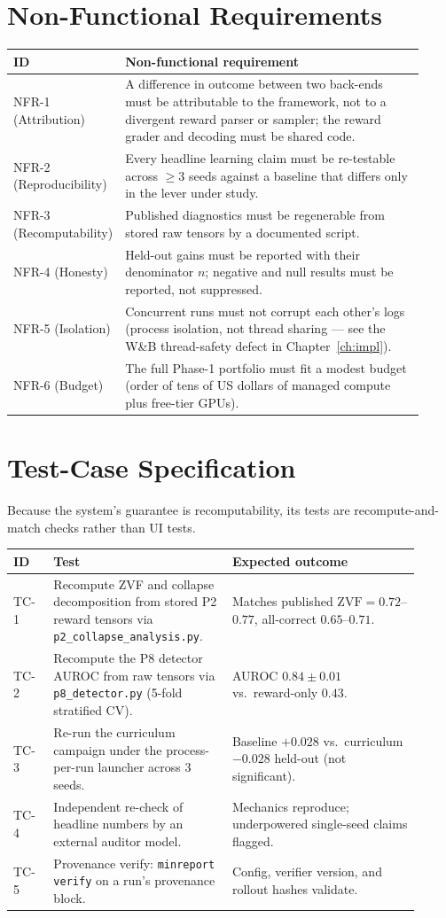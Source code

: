 \documentclass[12pt,a4paper]{report}
\newcommand{\zvf}{\mathrm{ZVF}}
\begin{document}
\section{Non-Functional Requirements}
\begin{longtable}{@{}L{0.10\linewidth}L{0.82\linewidth}@{}}
\toprule
\textbf{ID} & \textbf{Non-functional requirement} \\
\midrule
\endhead
NFR-1 (Attribution) & A difference in outcome between two back-ends must be
attributable to the framework, not to a divergent reward parser or sampler; the
reward grader and decoding must be shared code. \\
NFR-2 (Reproducibility) & Every headline learning claim must be re-testable across
$\ge 3$ seeds against a baseline that differs only in the lever under study. \\
NFR-3 (Recomputability) & Published diagnostics must be regenerable from stored raw
tensors by a documented script. \\
NFR-4 (Honesty) & Held-out gains must be reported with their denominator $n$;
negative and null results must be reported, not suppressed. \\
NFR-5 (Isolation) & Concurrent runs must not corrupt each other's logs (process
isolation, not thread sharing --- see the W\&B thread-safety defect in
Chapter~\ref{ch:impl}). \\
NFR-6 (Budget) & The full Phase-1 portfolio must fit a modest budget (order of tens
of US dollars of managed compute plus free-tier GPUs). \\
\bottomrule
\end{longtable}

\section{Test-Case Specification}
Because the system's guarantee is recomputability, its tests are recompute-and-match
checks rather than UI tests.
\begin{longtable}{@{}L{0.09\linewidth}L{0.40\linewidth}L{0.42\linewidth}@{}}
\toprule
\textbf{ID} & \textbf{Test} & \textbf{Expected outcome} \\
\midrule
\endhead
TC-1 & Recompute ZVF and collapse decomposition from stored P2 reward tensors via
\texttt{p2\_collapse\_analysis.py}. & Matches published $\zvf=0.72$--$0.77$,
all-correct $0.65$--$0.71$. \\
TC-2 & Recompute the P8 detector AUROC from raw tensors via
\texttt{p8\_detector.py} (5-fold stratified CV). & AUROC $0.84\pm0.01$ vs.\
reward-only $0.43$. \\
TC-3 & Re-run the curriculum campaign under the process-per-run launcher across
3 seeds. & Baseline $+0.028$ vs.\ curriculum $-0.028$ held-out (not significant). \\
TC-4 & Independent re-check of headline numbers by an external auditor model. &
Mechanics reproduce; underpowered single-seed claims flagged. \\
TC-5 & Provenance verify: \texttt{minreport verify} on a run's provenance block. &
Config, verifier version, and rollout hashes validate. \\
\bottomrule
\end{longtable}
\end{document}
